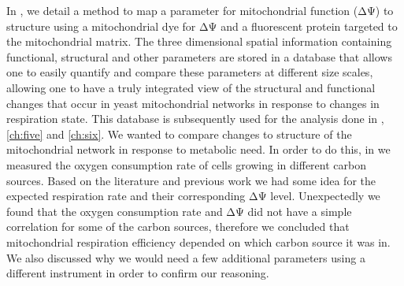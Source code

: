 In , we detail a method to map a parameter for mitochondrial function (ΔΨ) to structure using a mitochondrial dye for ΔΨ and a fluorescent protein targeted to the mitochondrial matrix. The three dimensional spatial information containing functional, structural and other parameters are stored in a database that allows one to easily quantify and compare these parameters at different size scales, allowing one to have a truly integrated view of the structural and functional changes that occur in yeast mitochondrial networks in response to changes in respiration state. This database is subsequently used for the analysis done in , \ref{ch:five} and \ref{ch:six}. We wanted to compare changes to structure of the mitochondrial network in response to metabolic need. In order to do this, in  we measured the oxygen consumption rate of cells growing in different carbon sources. Based on the literature and previous work we had some idea for the expected respiration rate and their corresponding ΔΨ level. Unexpectedly we found that the oxygen consumption rate and ΔΨ did not have a simple correlation for some of the carbon sources, therefore we concluded that mitochondrial respiration efficiency depended on which carbon source it was in. We also discussed why we would need a few additional parameters using a different instrument in order to confirm our reasoning. 

